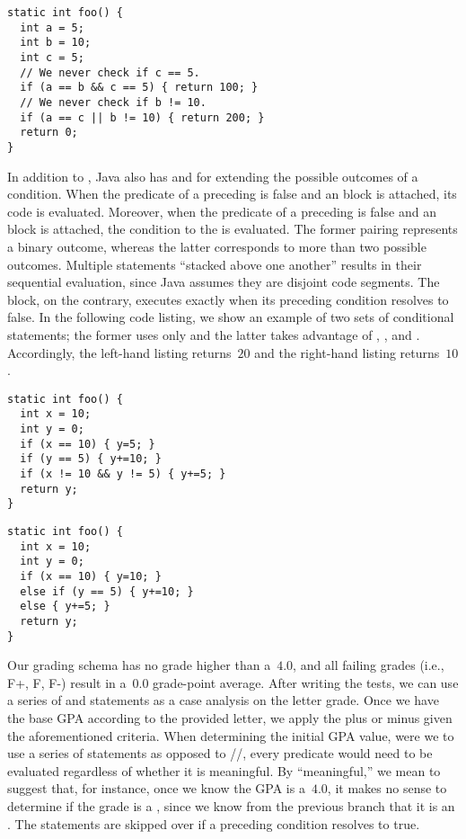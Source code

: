 \begin{lstlisting}[language=MyJava]
static int foo() {
  int a = 5;
  int b = 10;
  int c = 5;
  // We never check if c == 5.
  if (a == b && c == 5) { return 100; }
  // We never check if b != 10.
  if (a == c || b != 10) { return 200; }
  return 0;
}
\end{lstlisting}

In addition to , Java also has  and  for extending the possible outcomes of a condition. 
When the predicate of a preceding  is false and an  block is attached, its code is evaluated. 
Moreover, when the predicate of a preceding  is false and an  block is attached, the condition to the  is evaluated. 
The former pairing represents a binary outcome, whereas the latter corresponds to more than two possible outcomes. 
Multiple  statements ``stacked above one another'' results in their sequential evaluation, since Java assumes they are disjoint code segments. 
The  block, on the contrary, executes exactly when its preceding  condition resolves to false. 
In the following code listing, we show an example of two sets of conditional statements; the former uses only  and the latter takes advantage of , , and . 
Accordingly, the left-hand listing returns~$20$ and the right-hand listing returns~$10$.

\begin{clrr}[]{}
\begin{lstlisting}[language=MyJavaNF]
static int foo() {
  int x = 10;
  int y = 0;
  if (x == 10) { y=5; } 
  if (y == 5) { y+=10; }
  if (x != 10 && y != 5) { y+=5; }
  return y;
}
\end{lstlisting}
\tcblower
\begin{lstlisting}[language=MyJavaNF]
static int foo() {
  int x = 10;
  int y = 0;
  if (x == 10) { y=10; } 
  else if (y == 5) { y+=10; } 
  else { y+=5; }
  return y;
}
\end{lstlisting}
\end{clrr}

Our grading schema has no grade higher than a~$4.0$, and all failing grades (i.e., F+, F, F-) result in a~$0.0$ grade-point average. 
After writing the tests, we can use a series of  and  statements as a case analysis on the letter grade. 
Once we have the base GPA according to the provided letter, we apply the plus or minus given the aforementioned criteria. 
When determining the initial GPA value, were we to use a series of  statements as opposed to //, every predicate would need to be evaluated regardless of whether it is meaningful. 
By ``meaningful,'' we mean to suggest that, for instance, once we know the GPA is a~$4.0$, it makes no sense to determine if the grade is a , since we know from the previous branch that it is an . 
The  statements are skipped over if a preceding condition resolves to true.

